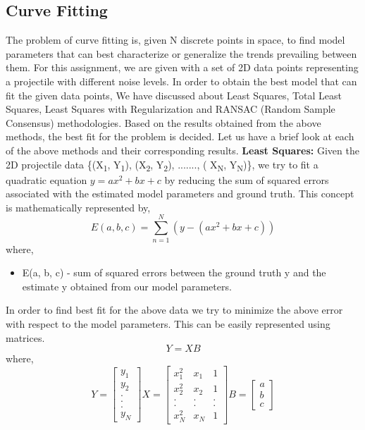 \documentclass{article}
\begin{document}
\subsection{Curve Fitting}
The problem of curve fitting is, given N discrete points in space, to find model parameters that can best characterize or generalize the trends prevailing between them. For this assignment, we are given with a set of 2D data points representing a projectile with different noise levels. In order to obtain the best model that can fit the given data points, We have discussed about Least Squares, Total Least Squares, Least Squares with Regularization and RANSAC (Random Sample Consensus) methodologies. Based on the results obtained from the above methods, the best fit for the problem is decided. Let us have a brief look at each of the above methods and their corresponding results.
\newline \newline \textbf{Least Squares:}
\newline Given the 2D projectile data \{(X\textsubscript{1}, Y\textsubscript{1}), (X\textsubscript{2}, Y\textsubscript{2}), ......., ( X\textsubscript{N}, Y\textsubscript{N})\}, we try to fit a quadratic equation $y = a{x^2} + bx + c$ by reducing the sum of squared errors associated with the estimated model parameters and ground truth. This concept is mathematically represented by,
\begin{equation}
\boxed{E(a, b, c) = \sum_{n = 1}^{N} (y - (a{x^2} + bx + c))}
\end{equation}
where,
\begin{itemize}
    \item E(a, b, c) - sum of squared errors between the ground truth y and the estimate y obtained from our model parameters. 
\end{itemize}
In order to find best fit for the above data we try to minimize the above error with respect to the model parameters. This can be easily represented using matrices.
\begin{equation}
\boxed{Y = XB}
\end{equation}
where, 
\begin{equation}
\boxed{Y = 
\begin{bmatrix}
y_1 \\ y_2 \\ . \\ . \\ . \\ y_N
\end{bmatrix}
X = 
\begin{bmatrix}
x^2_1 & x_1 & 1 \\ x^2_2 & x_2 & 1 \\ . & . & . \\ . & . & . \\
x^2_N & x_N & 1 
\end{bmatrix}
B = 
\begin{bmatrix}
a \\ b \\ c
\end{bmatrix}}
\end{equation}
\end{document}
